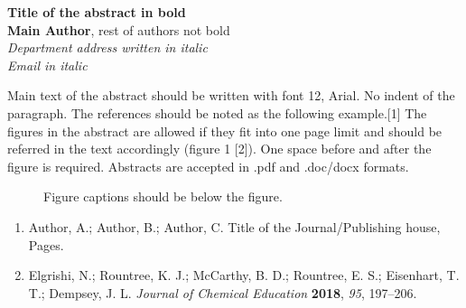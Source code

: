\documentclass[12pt,a4paper]{article}
\begin{document}
\begin{center}
  {\Large \textbf{Title of the abstract in bold}}\\[12pt]
  \textbf{Main Author}, rest of authors not bold\\[6pt]
  \textit{Department address written in italic}\\[4pt]
  \textit{Email in italic}
\end{center}

\vspace{12pt}

Main text of the abstract should be written with font 12, Arial. No indent of the paragraph. The references should be noted as the following example.[1] The figures in the abstract are allowed if they fit into one page limit and should be referred in the text accordingly (figure 1 [2]). One space before and after the figure is required. Abstracts are accepted in .pdf and .doc/docx formats.

\vspace{12pt}

\begin{figure}[h!]
  \centering
  \fbox{\rule{0pt}{4cm}\rule{8cm}{0pt}} %
  \caption{Figure captions should be below the figure.}
  \label{fig:1}
\end{figure}

\vspace{12pt}

\begin{enumerate}
  \item[(1)] Author, A.; Author, B.; Author, C. Title of the Journal/Publishing house, Pages.
  \item[(2)] Elgrishi, N.; Rountree, K. J.; McCarthy, B. D.; Rountree, E. S.; Eisenhart, T. T.; Dempsey, J. L. \textit{Journal of Chemical Education} \textbf{2018}, \textit{95}, 197--206.
\end{enumerate}
\end{document}
